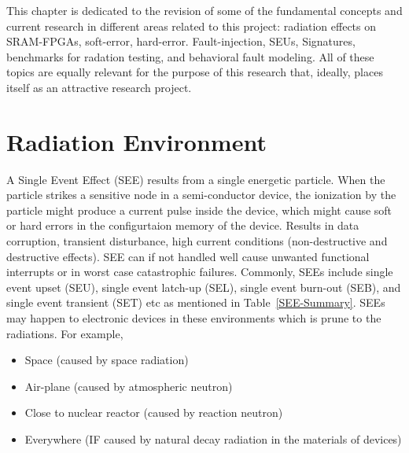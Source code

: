 

This chapter is dedicated to the revision of some of the fundamental concepts and current research in different areas related to this project: radiation effects on SRAM-FPGAs, soft-error, hard-error. Fault-injection, SEUs, Signatures, benchmarks for radation testing, and behavioral fault modeling. All of these topics are equally relevant for the purpose of this research that, ideally, places itself as an attractive research project.

\section{Radiation Environment}

A Single Event Effect (SEE) results from a single energetic particle. When the particle strikes a sensitive node in a semi-conductor device, the ionization by the particle might produce a current pulse inside the device, which might cause soft or hard errors in the configurtaion memory of the device. Results in data corruption, transient disturbance, high current conditions (non-destructive and destructive
effects). SEE can if not handled well cause unwanted functional interrupts or in worst case catastrophic failures. Commonly, SEEs include single event upset (SEU), single event latch-up (SEL), single event burn-out (SEB), and single event transient (SET) etc as mentioned in Table~\ref{SEE-Summary}. SEEs may happen to electronic devices in these environments which is prune to the radiations. For example,
\begin{itemize}


   \item  Space (caused by space radiation)
    \item Air-plane (caused by atmospheric neutron)
    \item Close to nuclear reactor (caused by reaction neutron)
    \item Everywhere (IF caused by natural decay radiation in the materials of devices)

\end{itemize}



